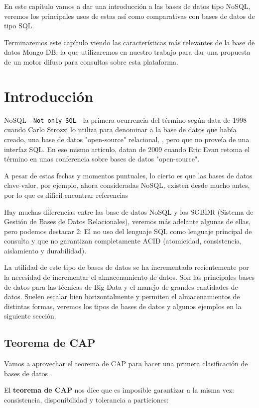 En este capítulo vamos a dar una introducción a las bases de datos tipo NoSQL, veremos los principales usos de estas así como comparativas con bases de datos de tipo SQL.

Terminaremos este capítulo viendo las características más relevantes de la base de datos Mongo DB, la que utilizaremos en nuestro trabajo para dar una propuesta de un motor difuso para consultas sobre esta plataforma.

\section{Introducción}
NoSQL - \texttt{Not only SQL} - la primera ocurrencia del término  según \cite{chalmerthesis} data de 1998 cuando Carlo Strozzi lo utiliza para denominar a la base de datos que había creado, una base de datos "open-source" relacional, \cite{strozzidb}, pero que no proveía de una interfaz SQL. En ese mismo artículo, datan de 2009 cuando Eric Evan retoma el término en unas conferencia sobre bases de datos "open-source".

A pesar de estas fechas y momentos puntuales, lo cierto es que las bases de datos clave-valor, por ejemplo, ahora consideradas NoSQL, existen desde mucho antes, por lo que es difícil encontrar referencias 

Hay muchas diferencias entre las base de datos NoSQL y los SGBDR (Sistema de Gestión de Bases de Datos Relacionales), veremos más adelante algunas de ellas, pero podemos destacar 2: El no uso del lenguaje SQL como lenguaje principal de consulta y que no garantizan completamente ACID (atomicidad, consistencia, aislamiento y durabilidad). 

La utilidad de este tipo de bases de datos se ha incrementado recientemente por la necesidad de incrementar el almacenamiento de datos. Son las principales bases de datos para las técnicas de Big Data y el manejo de grandes cantidades de datos. Suelen escalar bien horizontalmente y permiten el almacenamientos de distintas formas, veremos los tipos de bases de datos y algunos ejemplos en la siguiente sección.

\subsection{Teorema de CAP}
Vamos a aprovechar el teorema de CAP para hacer una primera clasificación de bases de datos \cite{captheorem}.

El \textbf{teorema de CAP} nos dice que es imposible garantizar a la misma vez: consistencia, disponibilidad y tolerancia a particiones:

